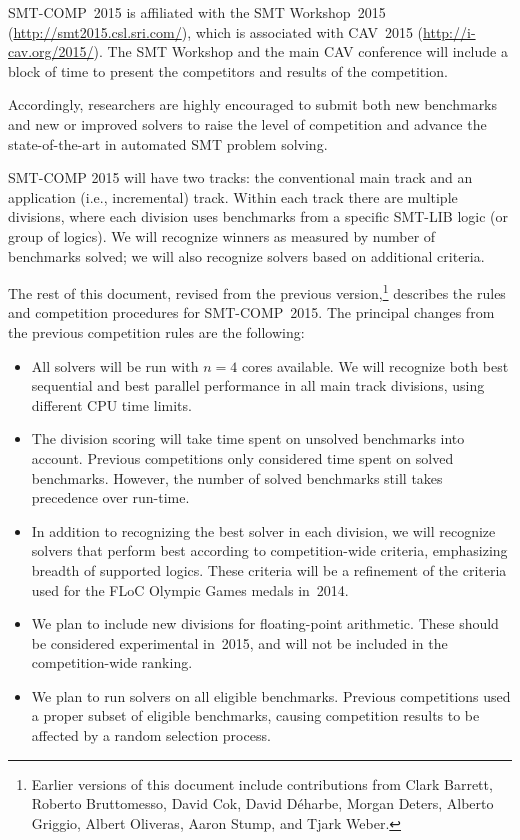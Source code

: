 \documentclass[12pt]{article}
\begin{document}
SMT-COMP~2015 is affiliated with the SMT Workshop~2015
(\url{http://smt2015.csl.sri.com/}), which is associated with CAV~2015
(\url{http://i-cav.org/2015/}).  The SMT Workshop and the main CAV
conference will include a block of time to present the competitors and
results of the competition.

Accordingly, researchers are highly encouraged to submit both new
benchmarks and new or improved solvers to raise the level of
competition and advance the state-of-the-art in automated SMT problem
solving.

SMT-COMP 2015 will have two tracks: the conventional main track and an
application (i.e., incremental) track.  Within each track there are
multiple divisions, where each division uses benchmarks from a
specific SMT-LIB logic (or group of logics).  We will recognize
winners as measured by number of benchmarks solved; we will also
recognize solvers based on additional criteria.

The rest of this document, revised from the previous
version,\footnote{Earlier versions of this document include
  contributions from Clark Barrett, Roberto Bruttomesso, David Cok,
  David D{\'e}harbe, Morgan Deters, Alberto Griggio, Albert Oliveras,
  Aaron Stump, and Tjark Weber.} describes the rules and competition
procedures for SMT-COMP~2015.  The principal changes from the previous
competition rules are the following:
\begin{itemize}
\item All solvers will be run with $n=4$ cores available.  We will
  recognize both best sequential and best parallel performance in all
  main track divisions, using different CPU time limits.
\item The division scoring will take time spent on unsolved benchmarks
  into account.  Previous competitions only considered time spent on
  solved benchmarks.  However, the number of solved benchmarks still
  takes precedence over run-time.
\item In addition to recognizing the best solver in each division, we
  will recognize solvers that perform best according to
  competition-wide criteria, emphasizing breadth of supported logics.
  These criteria will be a refinement of the criteria used for the
  FLoC Olympic Games medals in~2014.
\item We plan to include new divisions for floating-point arithmetic.
  These should be considered experimental in~2015, and will not be
  included in the competition-wide ranking.
\item We plan to run solvers on all eligible benchmarks.  Previous
  competitions used a proper subset of eligible benchmarks, causing
  competition results to be affected by a random selection process.
\end{itemize}
\end{document}
